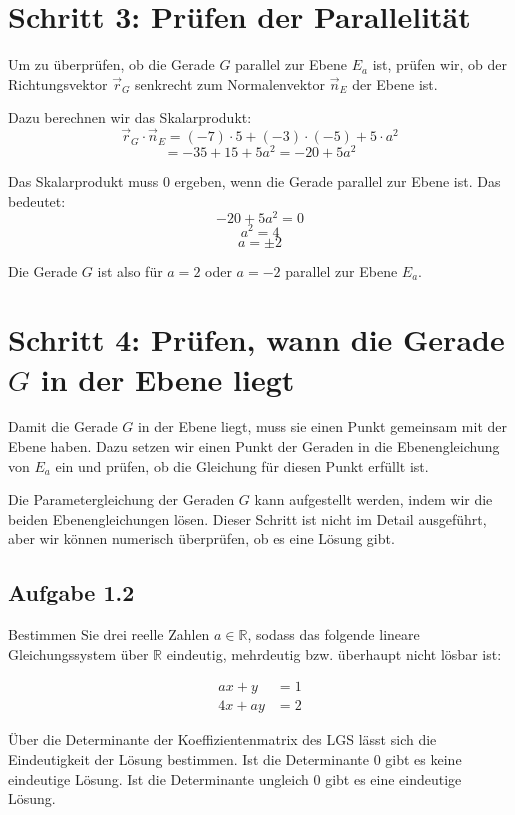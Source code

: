 \documentclass[11pt]{article}
\begin{document}
\section*{Schritt 3: Prüfen der Parallelität}

Um zu überprüfen, ob die Gerade \( G \) parallel zur Ebene \( E_a \) ist, prüfen wir, ob der Richtungsvektor \( \vec{r}_G \) senkrecht zum Normalenvektor \( \vec{n}_E \) der Ebene ist.

Dazu berechnen wir das Skalarprodukt:
\[
\vec{r}_G \cdot \vec{n}_E = (-7) \cdot 5 + (-3) \cdot (-5) + 5 \cdot a^2
\]
\[
= -35 + 15 + 5a^2 = -20 + 5a^2
\]

Das Skalarprodukt muss 0 ergeben, wenn die Gerade parallel zur Ebene ist. Das bedeutet:
\[
-20 + 5a^2 = 0
\]
\[
a^2 = 4
\]
\[
a = \pm 2
\]

Die Gerade \( G \) ist also für \( a = 2 \) oder \( a = -2 \) parallel zur Ebene \( E_a \).

\section*{Schritt 4: Prüfen, wann die Gerade \( G \) in der Ebene liegt}

Damit die Gerade \( G \) in der Ebene liegt, muss sie einen Punkt gemeinsam mit der Ebene haben. Dazu setzen wir einen Punkt der Geraden in die Ebenengleichung von \( E_a \) ein und prüfen, ob die Gleichung für diesen Punkt erfüllt ist.

Die Parametergleichung der Geraden \( G \) kann aufgestellt werden, indem wir die beiden Ebenengleichungen lösen. Dieser Schritt ist nicht im Detail ausgeführt, aber wir können numerisch überprüfen, ob es eine Lösung gibt.

\subsection{Aufgabe 1.2}
Bestimmen Sie drei reelle Zahlen $a \in \mathbb{R}$, sodass das folgende lineare Gleichungssystem über $\mathbb{R}$ eindeutig, mehrdeutig bzw. überhaupt nicht lösbar ist:

\[
\begin{aligned}
    ax + y & = 1 \\
    4x + ay & = 2
\end{aligned}
\]

Über die Determinante der Koeffizientenmatrix des LGS lässt sich die Eindeutigkeit der Lösung bestimmen. Ist die
Determinante 0 gibt es keine eindeutige Lösung. Ist die Determinante ungleich 0 gibt es eine eindeutige Lösung.
\end{document}
